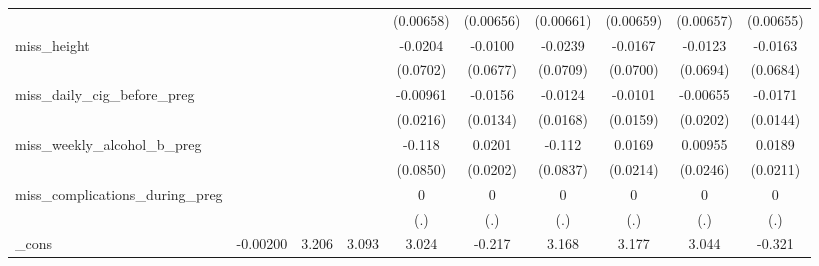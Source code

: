 \begin{table}[htbp]
\begin{tabular}{l*{9}{c}}
            &                     &                     &                     &   (0.00658)         &   (0.00656)         &   (0.00661)         &   (0.00659)         &   (0.00657)         &   (0.00655)         \\
[1em]
miss\_height &                     &                     &                     &     -0.0204         &     -0.0100         &     -0.0239         &     -0.0167         &     -0.0123         &     -0.0163         \\
            &                     &                     &                     &    (0.0702)         &    (0.0677)         &    (0.0709)         &    (0.0700)         &    (0.0694)         &    (0.0684)         \\
[1em]
miss\_daily\_cig\_before\_preg&                     &                     &                     &    -0.00961         &     -0.0156         &     -0.0124         &     -0.0101         &    -0.00655         &     -0.0171         \\
            &                     &                     &                     &    (0.0216)         &    (0.0134)         &    (0.0168)         &    (0.0159)         &    (0.0202)         &    (0.0144)         \\
[1em]
miss\_weekly\_alcohol\_b\_preg&                     &                     &                     &      -0.118         &      0.0201         &      -0.112         &      0.0169         &     0.00955         &      0.0189         \\
            &                     &                     &                     &    (0.0850)         &    (0.0202)         &    (0.0837)         &    (0.0214)         &    (0.0246)         &    (0.0211)         \\
[1em]
miss\_complications\_during\_preg&                     &                     &                     &           0         &           0         &           0         &           0         &           0         &           0         \\
            &                     &                     &                     &         (.)         &         (.)         &         (.)         &         (.)         &         (.)         &         (.)         \\
[1em]
\_cons      &    -0.00200         &       3.206\sym{**} &       3.093\sym{**} &       3.024\sym{**} &      -0.217         &       3.168\sym{**} &       3.177\sym{**} &       3.044\sym{**} &      -0.321         \\

\end{tabular}
\end{table}
